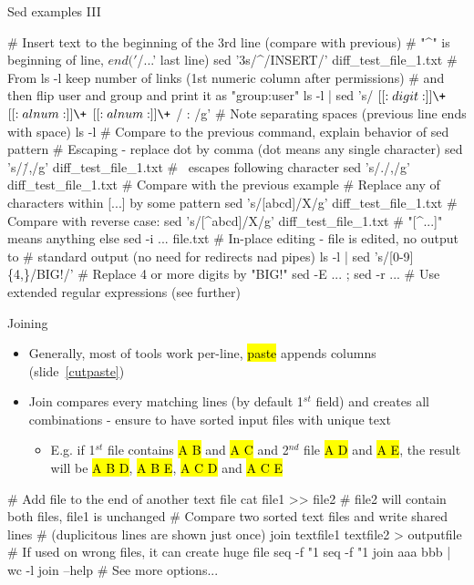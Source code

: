 \documentclass[compress, ucs, xelatex, 11pt, xcolor=svgnames,
  hyperref={
    bookmarks=true,
    unicode=true,
    colorlinks=true,
    pdftitle={Linux, command line and MetaCentrum},
    plainpages=false,
    pdfauthor={Vojtech Zeisek},
    pdfsubject={Course about use of Linux command line, writing shell scripts and using MetaCentrum of CESNET},
    pdfcreator={XeLaTeX},
    pdfkeywords={Linux, GNU, BASH, shell, command line, MetaCentrum},
    linkcolor=DarkRed,
    anchorcolor=DarkBlue,
    citecolor=Indigo,
    filecolor=NavyBlue,
    menucolor=DarkMagenta,
    urlcolor=DarkBlue,
    pdftex},
  url={hyphens, lowtilde} %
  ]{beamer}
\renewcommand{\texttt}[1]{\hl{\ttfamily #1}}
\begin{document}
\begin{frame}[fragile]{Sed examples III}
  \begin{bashcode}
    # Insert text to the beginning of the 3rd line (compare with previous)
    # "^" is beginning of line, $ end ('$/...' last line)
    sed '3s/^/INSERT/' diff_test_file_1.txt
    # From ls -l keep number of links (1st numeric column after permissions)
    # and then flip user and group and print it as "group:user"
    ls -l | sed 's/ \([[:digit:]]\+\) \([[:alnum:]]\+\) \([[:alnum:]]\+\) /
      \1 \3:\2 /g' # Note separating spaces (previous line ends with space)
    ls -l # Compare to the previous command, explain behavior of sed pattern
    # Escaping - replace dot by comma (dot means any single character)
    sed 's/\./,/g' diff_test_file_1.txt # \ escapes following character
    sed 's/./,/g' diff_test_file_1.txt # Compare with the previous example
    # Replace any of characters within [...] by some pattern
    sed 's/[abcd]/X/g' diff_test_file_1.txt # Compare with reverse case:
    sed 's/[^abcd]/X/g' diff_test_file_1.txt # "[^...]" means anything else
    sed -i ... file.txt # In-place editing - file is edited, no output to
                        # standard output (no need for redirects nad pipes)
    ls -l | sed 's/[0-9]\{4,\}/BIG!/' # Replace 4 or more digits by "BIG!"
    sed -E ... ; sed -r ... # Use extended regular expressions (see further)
  \end{bashcode}
\end{frame}

\begin{frame}[fragile]{Joining}
  \begin{itemize}
    \item Generally, most of tools work per-line, \texttt{paste} appends columns (slide~\ref{cutpaste})
    \item Join compares every matching lines (by default 1$^{st}$ field) and creates all combinations - ensure to have sorted input files with unique text
    \begin{itemize}
      \item E.g. if 1$^{st}$ file contains \texttt{A B} and \texttt{A C} and 2$^{nd}$ file \texttt{A D} and \texttt{A E}, the result will be \texttt{A B D}, \texttt{A B E}, \texttt{A C D} and \texttt{A C E}
    \end{itemize}
  \end{itemize}
  \begin{bashcode}
    # Add file to the end of another text file
    cat file1 >> file2 # file2 will contain both files, file1 is unchanged
    # Compare two sorted text files and write shared lines
    # (duplicitous lines are shown just once)
    join textfile1 textfile2 > outputfile
    # If used on wrong files, it can create huge file
    seq -f "1 %
    seq -f "1 %
    join aaa bbb | wc -l
    join --help # See more options...
  \end{bashcode}
  \vfill
\end{frame}
\end{document}
